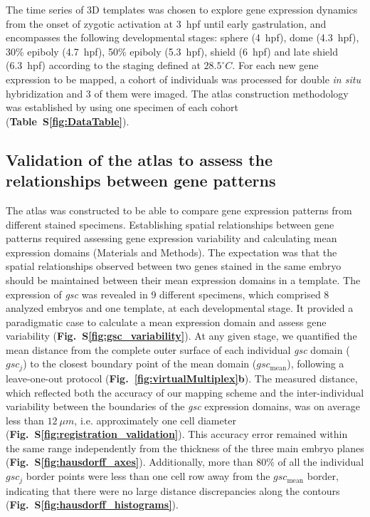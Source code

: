 The time series of 3D templates was chosen to explore gene expression dynamics from the onset of zygotic activation at 3~hpf until early gastrulation, and encompasses the following developmental stages: sphere (4~hpf), dome (4.3~hpf), 30\% epiboly (4.7~hpf), 50\% epiboly (5.3~hpf), shield (6~hpf) and late shield (6.3~hpf) according to the staging defined at $28.5^\circ C$. For each new gene expression to be mapped, a cohort of individuals was processed for double \emph{in situ} hybridization and 3 of them were imaged. The atlas construction methodology was established by using one specimen of each cohort (\textbf{Table~S\ref{fig:DataTable}}).



\subsection*{Validation of the atlas to assess the relationships between gene patterns}



The atlas was constructed to be able to compare gene expression patterns from different stained specimens. Establishing spatial relationships between gene patterns required assessing gene expression variability and calculating mean expression domains (Materials and Methods). The expectation was that the spatial relationships observed between two genes stained in the same embryo should be maintained between their mean expression domains in a template. The expression of \emph{gsc} was revealed in 9 different specimens, which comprised 8 analyzed embryos and one template, at each developmental stage. It provided a paradigmatic case to calculate a mean expression domain and assess gene variability (\textbf{Fig.~S\ref{fig:gsc_variability}}). At any given stage, we quantified the mean distance from the complete outer surface of each individual \emph{gsc} domain ($gsc_j$) to the closest boundary point of the mean domain ($gsc_\mathrm{mean}$), following a leave-one-out protocol (\textbf{Fig.~\ref{fig:virtualMultiplex}b}). The measured distance, which reflected both the accuracy of our mapping scheme and the inter-individual variability between the boundaries of the \emph{gsc} expression domains, was on average less than $12~\mu m$, i.e. approximately one cell diameter (\textbf{Fig.~S\ref{fig:registration_validation}}). This accuracy error remained within the same range independently from the thickness of the three main embryo planes (\textbf{Fig.~S\ref{fig:hausdorff_axes}}). Additionally, more than 80\% of all the individual $gsc_j$ border points were less than one cell row away from the $gsc_\mathrm{mean}$ border, indicating that there were no large distance discrepancies along the contours (\textbf{Fig.~S\ref{fig:hausdorff_histograms}}).



